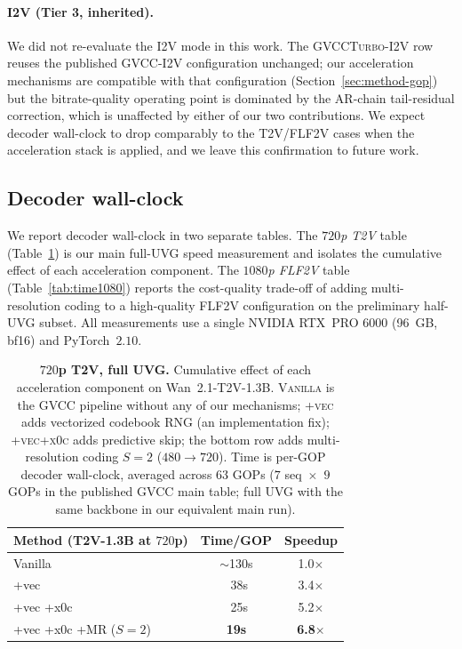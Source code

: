 \paragraph{I2V (Tier 3, inherited).}
We did not re-evaluate the I2V mode in this work. The
\textsc{GVCCTurbo-I2V} row reuses the published GVCC-I2V configuration
unchanged; our acceleration mechanisms are compatible with that
configuration (Section~\ref{sec:method-gop}) but the bitrate-quality
operating point is dominated by the AR-chain tail-residual correction,
which is unaffected by either of our two contributions. We expect
decoder wall-clock to drop comparably to the T2V/FLF2V cases when the
acceleration stack is applied, and we leave this confirmation to
future work.

\subsection{Decoder wall-clock}
\label{sec:exp-time}

We report decoder wall-clock in two separate tables. The
\emph{$720$p T2V} table (Table~\ref{tab:time720}) is our main full-UVG
speed measurement and isolates the cumulative effect of each
acceleration component. The \emph{$1080$p FLF2V} table
(Table~\ref{tab:time1080}) reports the cost-quality trade-off of adding
multi-resolution coding to a high-quality FLF2V configuration on the
preliminary half-UVG subset. All measurements use a single NVIDIA
RTX~PRO 6000 (96~GB, bf16) and PyTorch~$2.10$.

\begin{table}[t]
\centering
\caption{\textbf{$720$p T2V, full UVG.} Cumulative effect of each
acceleration component on Wan~2.1-T2V-1.3B. \textsc{Vanilla} is the
GVCC pipeline without any of our mechanisms; \textsc{+vec} adds
vectorized codebook RNG (an implementation fix);
\textsc{+vec+x0c} adds predictive skip; the bottom row adds
multi-resolution coding $S\!=\!2$ ($480\!\to\!720$). Time is per-GOP
decoder wall-clock, averaged across $63$ GOPs ($7$ seq~$\times$~$9$
GOPs in the published GVCC main table; full UVG with the same backbone
in our equivalent main run).}
\label{tab:time720}
\small
\begin{tabular}{@{}l c c@{}}
\toprule
Method (T2V-1.3B at $720$p) & Time/GOP & Speedup \\
\midrule
Vanilla        & $\sim$130s & 1.0$\times$ \\
+vec           & ~38s       & 3.4$\times$ \\
+vec +x0c      & ~25s       & 5.2$\times$ \\
\rowcolor{wacvblue!10}
+vec +x0c +MR ($S\!=\!2$) & \textbf{19s} & \textbf{6.8$\times$} \\
\bottomrule
\end{tabular}
\end{table}

